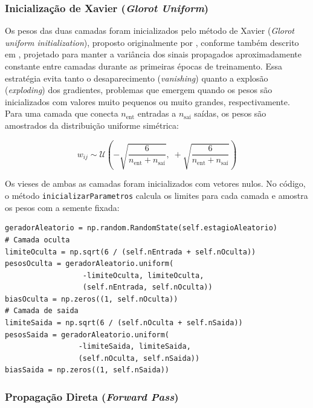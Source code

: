 \subsubsection{Inicialização de Xavier (\textit{Glorot Uniform})}

Os pesos das duas camadas foram inicializados pelo método de Xavier (\textit{Glorot uniform initialization}), proposto originalmente por , conforme também descrito em \cite{silva2016,dsa2022}, projetado para manter a variância dos sinais propagados aproximadamente constante entre camadas durante as primeiras épocas de treinamento. Essa estratégia evita tanto o desaparecimento (\textit{vanishing}) quanto a explosão (\textit{exploding}) dos gradientes, problemas que emergem quando os pesos são inicializados com valores muito pequenos ou muito grandes, respectivamente. Para uma camada que conecta $n_{\text{ent}}$ entradas a $n_{\text{saí}}$ saídas, os pesos são amostrados da distribuição uniforme simétrica:

\begin{equation}
w_{ij} \sim \mathcal{U}\!\left(-\sqrt{\frac{6}{n_{\text{ent}} + n_{\text{saí}}}},\; +\sqrt{\frac{6}{n_{\text{ent}} + n_{\text{saí}}}}\right)
\label{eq:xavier}
\end{equation}

Os vieses de ambas as camadas foram inicializados com vetores nulos. No código, o método \texttt{inicializarParametros} calcula os limites para cada camada e amostra os pesos com a semente fixada:

\begin{lstlisting}[caption={Inicialização de Xavier para as camadas do MLP NumPy.}, label={lst:mlp_xavier}]
geradorAleatorio = np.random.RandomState(self.estagioAleatorio)
# Camada oculta
limiteOculta = np.sqrt(6 / (self.nEntrada + self.nOculta))
pesosOculta = geradorAleatorio.uniform(
                  -limiteOculta, limiteOculta,
                  (self.nEntrada, self.nOculta))
biasOculta = np.zeros((1, self.nOculta))
# Camada de saida
limiteSaida = np.sqrt(6 / (self.nOculta + self.nSaida))
pesosSaida = geradorAleatorio.uniform(
                 -limiteSaida, limiteSaida,
                 (self.nOculta, self.nSaida))
biasSaida = np.zeros((1, self.nSaida))
\end{lstlisting}

\subsubsection{Propagação Direta (\textit{Forward Pass})}

